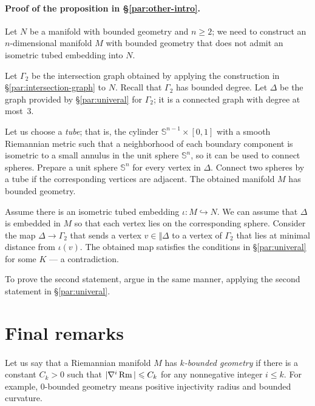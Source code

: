 \arxiv{\documentclass[a4paper,10pt]{article}}{\documentclass{mjm}}
\begin{document}
\paragraph{Proof of the proposition in §\ref{par:other-intro}.}\label{par:other-proof}
Let $N$ be a manifold with bounded geometry and $n\ge 2$;
we need to construct an $n$-dimensional manifold $M$ with bounded geometry that does not admit an isometric tubed embedding into $N$.

Let $\Gamma_2$ be the intersection graph obtained by applying the construction in §\ref{par:intersection-graph} to $N$.
Recall that $\Gamma_2$ has bounded degree.
Let $\Delta$ be the graph provided by §\ref{par:univeral} for $\Gamma_2$;
it is a connected graph with  degree at most~3.

Let us choose a \emph{tube}; that is, the cylinder $\mathbb{S}^{n-1}\times [0,1]$ with a smooth Riemannian metric such that a neighborhood of each boundary component is isometric to a small annulus in the unit sphere $\mathbb{S}^n$, so it can be used to connect spheres.
Prepare a unit sphere $\mathbb{S}^n$ for every vertex in $\Delta$.
Connect two spheres by a tube if the corresponding vertices are adjacent.
The obtained manifold $M$ has bounded geometry.

Assume there is an isometric tubed embedding $\iota\colon M\hookrightarrow N$.
We can assume that $\Delta$ is embedded in $M$ so that each vertex lies on the corresponding sphere.
Consider the map $\Delta\to \Gamma_2$ that sends a vertex $v\in \Vert \Delta$ to a vertex of $\Gamma_2$ that lies at minimal distance from $\iota(v)$.
The obtained map satisfies the conditions in §\ref{par:univeral} for some $K$ --- a contradiction.

To prove the second statement, argue in the same manner, applying the second statement in §\ref{par:univeral}.
\qeds





\section*{Final remarks}


\paragraph{}\label{par:remarks}
Let us say that a Riemannian manifold $M$ has \emph{$k$-bounded geometry} if there is a constant $C_k > 0$ such that $|\nabla^i \operatorname{\rm Rm}| \leqslant C_k$ for any nonnegative integer $i\le k$.
For example, $0$-bounded geometry means positive injectivity radius and bounded curvature.
\end{document}
